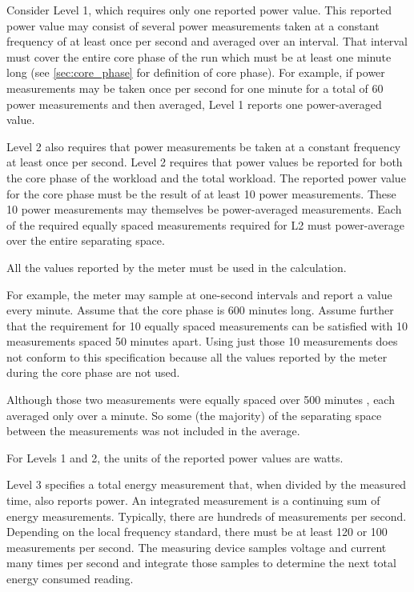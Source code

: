 \noindent
Consider Level 1, which requires only one reported power value. 
This reported power value may consist of several power measurements taken at a constant frequency of at least once per second and averaged over an interval. 
That interval must cover the entire core phase of the run which must be at least one minute long (see \ref{sec:core_phase} for definition of core phase).
For example, if power measurements may be taken once per second for one minute for a total of 60 power measurements and then averaged, Level 1 reports one power-averaged value.
\wl

\noindent
Level 2 also requires that power measurements be taken at a constant frequency at least once per second.
Level 2 requires that power values be reported for both the core phase of the workload and the total workload.
The reported power value for the core phase must be the result of at least 10 power measurements.
These 10 power measurements may themselves be power-averaged measurements.
Each of the required equally spaced measurements required for L2 must power-average over the entire separating space.  
\wl

\noindent
All the values reported by the meter must be used in the calculation.
\wl

\noindent
For example, the meter may sample at one-second intervals and report a value every minute. Assume that the core phase is 600 minutes long. Assume further that the requirement for 10 equally spaced measurements can be satisfied with 10 measurements spaced 50 minutes apart. Using just those 10 measurements does not conform to this specification because all the values reported by the meter during the core phase are not used. 
\wl

\noindent
Although those two measurements were equally spaced over 500 minutes , each averaged only over a minute. So some (the majority) of the separating space between the measurements was not included in the average. 
\wl

\noindent
For Levels 1 and 2, the units of the reported power values are watts.
\wl

\noindent
Level 3 specifies a total energy measurement that, when divided by the measured time, also reports power. An integrated measurement is a continuing sum of energy measurements. Typically, there are hundreds of measurements per second.  Depending on the local frequency standard, there must be at least 120 or 100 measurements per second. The measuring device samples voltage and current many times per second and integrate those samples to determine the next total energy consumed reading. 
\wl

